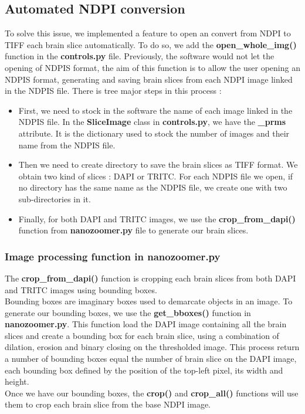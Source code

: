 \documentclass[a4paper,12pt]{report}
\begin{document}
\subsection{Automated NDPI conversion}
To solve this issue, we implemented a feature to open an convert from NDPI to TIFF each brain slice automatically. To do so, we add the \textbf{open\_whole\_img()} function in the \textbf{controls.py} file. Previously, the software would not let the opening of NDPIS format, the aim of this function is to allow the user opening an NDPIS format, generating and saving brain slices from each NDPI image linked in the NDPIS file. There is tree major steps in this process : \vspace{0.2\baselineskip} 
\begin{itemize}
    \item First, we need to stock in the software the name of each image linked in the NDPIS file. In the \textbf{SliceImage} class in \textbf{controls.py}, we have the \textbf{\_prms{}} attribute. It is the dictionary used to stock the number of images and their name from the NDPIS file.
    \item Then we need to create directory to save the brain slices as TIFF format. We obtain two kind of slices : DAPI or TRITC. For each NDPIS file we open, if no directory has the same name as the NDPIS file, we create one with two sub-directories in it.
    \item Finally, for both DAPI and TRITC images, we use the \textbf{crop\_from\_dapi()} function from \textbf{nanozoomer.py} file to generate our brain slices.\\
\end{itemize}

\subsubsection{Image processing function in \textbf{nanozoomer.py}}
The \textbf{crop\_from\_dapi()} function is cropping each brain slices from both DAPI and TRITC images using bounding boxes.\\
\indent Bounding boxes are imaginary boxes used to demarcate objects in an image. To generate our bounding boxes, we use the \textbf{get\_bboxes()} function in \textbf{nanozoomer.py}. This function load the DAPI image containing all the brain slices and create a bounding box for each brain slice, using a combination of dilation, erosion and binary closing on the thresholded image. This process return a number of bounding boxes equal the number of brain slice on the DAPI image, each bounding box defined by the position of the top-left pixel, its width and height.\\
\indent Once we have our bounding boxes, the \textbf{crop()} and \textbf{crop\_all()} functions will use them to crop each brain slice from the base NDPI image. \\
\end{document}
